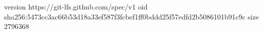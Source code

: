 version https://git-lfs.github.com/spec/v1
oid sha256:5473cc3ac66b53d18a33ef587f3fcbef1ff0bddd25f57edfd2b5086101b91c9c
size 2796368
